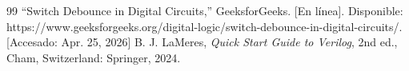 \documentclass[11pt]{article}
\newcounter{entrycount}
\newcommand{\logentry}[3]{%
  \refstepcounter{entrycount}%
  \section*{Bitácora \#\theentrycount: #1}%
  \hfill\textit{#2}\\[0.2cm]
  #3
  \vspace{0.5cm}
  \hrule
  \vspace{0.5cm}
}
\begin{document}
	\begin{thebibliography}{99}
	“Switch Debounce in Digital Circuits,” GeeksforGeeks. [En línea]. Disponible: https://www.geeksforgeeks.org/digital-logic/switch-debounce-in-digital-circuits/. [Accesado: Apr. 25, 2026]
	B. J. LaMeres, \textit{Quick Start Guide to Verilog}, 2nd ed., Cham, Switzerland: Springer, 2024.
	\end{thebibliography}
	
	
	
%     
%     
%     
\end{document}
